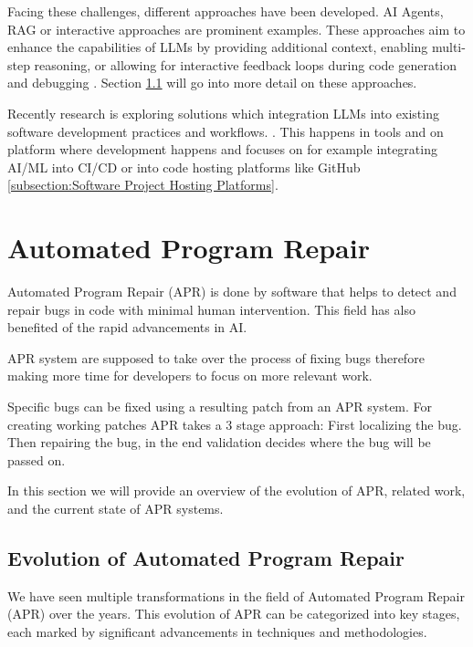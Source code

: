 Facing these challenges, different approaches have been developed. AI Agents, RAG or interactive approaches are prominent examples. These approaches aim to enhance the capabilities of LLMs by providing additional context, enabling multi-step reasoning, or allowing for interactive feedback loops during code generation and debugging \cite{houLargeLanguageModels2024, puvvadiCodingAgentsComprehensive2025}. Section \ref{subsection:evolution-apr} will go into more detail on these approaches.

Recently research is exploring solutions which integration LLMs into existing software development practices and workflows. \cite{puvvadiCodingAgentsComprehensive2025, dohmkeGitHubCopilotMeet2025, IntroducingCodex, sauvolaFutureSoftwareDevelopment2024}. This happens in tools and on platform where development happens and focuses on for example integrating AI/ML into CI/CD \cite{mohammedAIDrivenContinuousIntegration2024} or into code hosting platforms like GitHub \ref{subsection:Software Project Hosting Platforms}.

\section{Automated Program Repair}

Automated Program Repair (APR) is done by software that helps to detect and repair bugs in code with minimal human intervention.  This field has also benefited of the rapid advancements in AI.

APR system are supposed to take over the process of fixing bugs therefore making more time for developers to focus on more relevant work. \cite{houLargeLanguageModels2024}

Specific bugs can be fixed using a resulting patch from an APR system. For creating working patches APR takes a 3 stage approach: First localizing the bug. Then repairing the bug, in the end validation decides where the bug will be passed on.\cite{}

In this section we will provide an overview of the evolution of APR, related work, and the current state of APR systems.

\subsection{Evolution of Automated Program Repair} \label{subsection:evolution-apr}
We have seen multiple transformations in the field of Automated Program Repair (APR) over the years. This evolution of APR can be categorized into key stages, each marked by significant advancements in techniques and methodologies.

